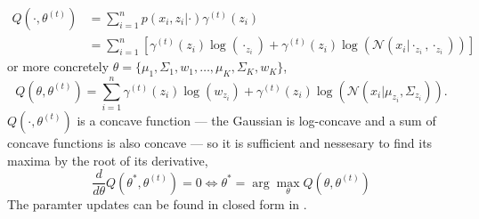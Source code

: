 \begin{align*}
    Q(\cdot, \theta^{(t)}) &= \sum_{i=1}^n p(x_i,z_i|\cdot) \gamma^{(t)}(z_i) \\
    &= \sum_{i=1}^n \left[ \gamma^{(t)}(z_i) \log(\cdot_{z_i})+\gamma^{(t)}(z_i) 
    \log(\mathcal{N}(x_i| \cdot_{z_i} , \cdot_{z_i}))\right]
\end{align*}
or more concretely $\theta = \{\mu_1 , \Sigma_1,w_1, \dots, \mu_K , \Sigma_K, w_K\}$, 
$$ Q(\theta, \theta^{(t)}) = \sum_{i=1}^n \gamma^{(t)}(z_i) \log(w_{z_i})+\gamma^{(t)}(z_i)
\log(\mathcal{N}(x_i| \mu_{z_i} , \Sigma_{z_i})).$$ $Q(\cdot, \theta^{(t)})$ is a concave function
--- the Gaussian is log-concave and a sum of concave functions is also concave --- so it is sufficient
and nessesary to find its maxima by the root of its derivative, 
$$\frac{d}{d \theta} Q(\theta^*, \theta^{(t)}) = 0 \iff \theta^* = \arg\max_{\theta} Q(\theta, \theta^{(t)})$$
The paramter updates can be found in closed form in \cite[439]{bishop}.



